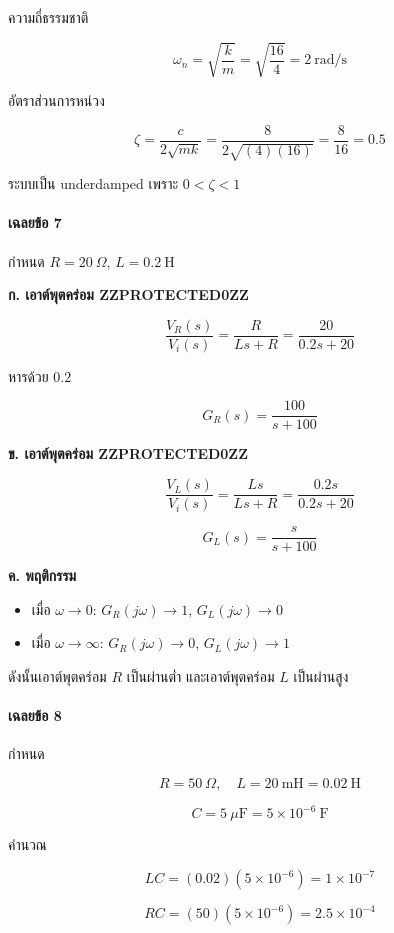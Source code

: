 ความถี่ธรรมชาติ

\[
\omega_n=\sqrt{\frac{k}{m}}
=\sqrt{\frac{16}{4}}
=\boxed{2\ \text{rad/s}}
\]

อัตราส่วนการหน่วง

\[
\zeta=\frac{c}{2\sqrt{mk}}
=
\frac{8}{2\sqrt{(4)(16)}}
=
\frac{8}{16}
=\boxed{0.5}
\]

ระบบเป็น underdamped เพราะ $0<\zeta<1$

\paragraph{เฉลยข้อ 7}

กำหนด $R=20\ \Omega$, $L=0.2\ \text{H}$

\textbf{ก. เอาต์พุตคร่อม ZZPROTECTED0ZZ}

\[
\frac{V_R(s)}{V_i(s)}
=
\frac{R}{Ls+R}
=
\frac{20}{0.2s+20}
\]

หารด้วย $0.2$

\[
\boxed{
G_R(s)=\frac{100}{s+100}
}
\]

\textbf{ข. เอาต์พุตคร่อม ZZPROTECTED0ZZ}

\[
\frac{V_L(s)}{V_i(s)}
=
\frac{Ls}{Ls+R}
=
\frac{0.2s}{0.2s+20}
\]

\[
\boxed{
G_L(s)=\frac{s}{s+100}
}
\]

\textbf{ค. พฤติกรรม}

\begin{itemize}
    \item เมื่อ $\omega\rightarrow0$: $G_R(j\omega)\rightarrow1$, $G_L(j\omega)\rightarrow0$
    \item เมื่อ $\omega\rightarrow\infty$: $G_R(j\omega)\rightarrow0$, $G_L(j\omega)\rightarrow1$
\end{itemize}

ดังนั้นเอาต์พุตคร่อม $R$ เป็นผ่านต่ำ และเอาต์พุตคร่อม $L$ เป็นผ่านสูง

\paragraph{เฉลยข้อ 8}

กำหนด

\[
R=50\ \Omega,\quad
L=20\ \text{mH}=0.02\ \text{H}
\]

\[
C=5\ \mu\text{F}=5\times10^{-6}\ \text{F}
\]

คำนวณ

\[
LC=(0.02)(5\times10^{-6})=1\times10^{-7}
\]

\[
RC=(50)(5\times10^{-6})=2.5\times10^{-4}
\]

